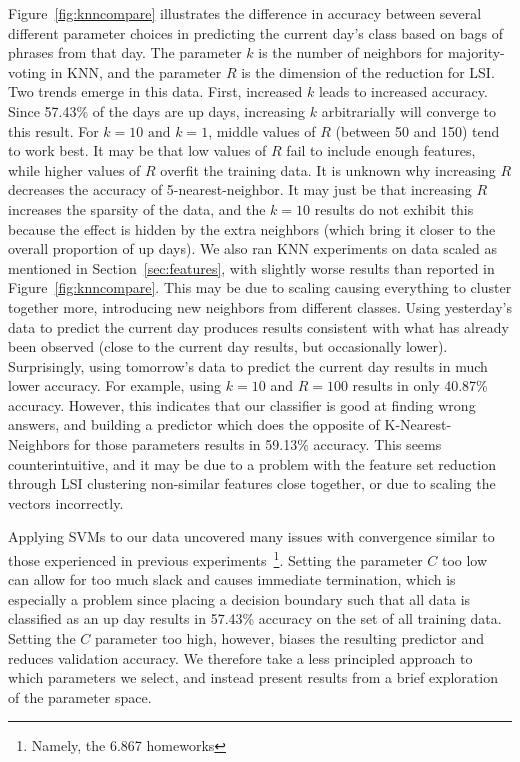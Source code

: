\documentclass[10pt, twocolumn]{article}
\begin{document}
Figure~\ref{fig:knncompare} illustrates the difference in accuracy between several different parameter choices in predicting the current day's class based on bags of phrases from that day. The parameter $k$ is the number of neighbors for majority-voting in KNN, and the parameter $R$ is the dimension of the reduction for LSI. Two trends emerge in this data. First, increased $k$ leads to increased accuracy. Since 57.43\% of the days are up days, increasing $k$ arbitrarially will converge to this result. For $k=10 \text{ and } k=1$, middle values of $R$ (between 50 and 150) tend to work best. It may be that low values of $R$ fail to include enough features, while higher values of $R$ overfit the training data. It is unknown why increasing $R$ decreases the accuracy of 5-nearest-neighbor. It may just be that increasing $R$ increases the sparsity of the data, and the $k=10$ results do not exhibit this because the effect is hidden by the extra neighbors (which bring it closer to the overall proportion of up days). We also ran KNN experiments on data scaled as mentioned in Section~\ref{sec:features}, with slightly worse results than reported in Figure~\ref{fig:knncompare}. This may be due to scaling causing everything to cluster together more, introducing new neighbors from different classes. Using yesterday's data to predict the current day produces results consistent with what has already been observed (close to the current day results, but occasionally lower). Surprisingly, using tomorrow's data to predict the current day results in much lower accuracy. For example, using $k=10$ and $R=100$ results in only 40.87\% accuracy. However, this indicates that our classifier is good at finding wrong answers, and building a predictor which does the opposite of K-Nearest-Neighbors for those parameters results in 59.13\% accuracy. This seems counterintuitive, and it may be due to a problem with the feature set reduction through LSI clustering non-similar features close together, or due to scaling the vectors incorrectly.

Applying SVMs to our data uncovered many issues with convergence similar to those experienced in previous experiments~\footnote{Namely, the 6.867 homeworks}. Setting the parameter $C$ too low can allow for too much slack and causes immediate termination, which is especially a problem since placing a decision boundary such that all data is classified as an up day results in 57.43\% accuracy on the set of all training data. Setting the $C$ parameter too high, however, biases the resulting predictor and reduces validation accuracy. We therefore take a less principled approach to which parameters we select, and instead present results from a brief exploration of the parameter space.
\end{document}
